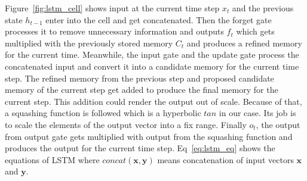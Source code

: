 \documentclass[10pt,twocolumn,letterpaper]{article}
\begin{document}
Figure~\ref{fig:lstm_cell} shows input at the current time step $x_t$ and the previous state $h_{t-1}$ enter into the cell and get concatenated. Then the forget gate processes it to remove unnecessary information and outputs $f_t$ which gets multiplied with the previously stored memory $C_t$ and produces a refined memory for the current time. Meanwhile, the input gate and the update gate process the concatenated input and convert it into a candidate memory for the current time step. The refined memory from the previous step and proposed candidate memory of the current step get added to produce the final memory for the current step. This addition could render the output out of scale. Because of that, a squashing function is followed which is a hyperbolic $tan$ in our case. Its job is to scale the elements of the output vector into a fix range. Finally $o_t$, the output from output gate gets multiplied with output from the squashing function and produces the output for the current time step. Eq~\ref{eq:lstm_eq} shows the equations of LSTM where $concat(\mathbf{x},\mathbf{y})$ means concatenation of input vectors $\mathbf{x}$ and $\mathbf{y}$.
\end{document}
